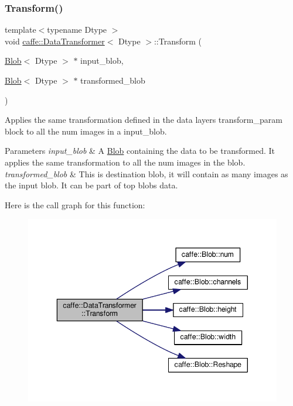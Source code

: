 \subsubsection{\texorpdfstring{Transform()}{Transform()}\hspace{0.1cm}{\footnotesize\ttfamily [5/6]}}
{\footnotesize\ttfamily template$<$typename Dtype $>$ \\
void \mbox{\hyperlink{classcaffe_1_1_data_transformer}{caffe\+::\+Data\+Transformer}}$<$ Dtype $>$\+::Transform (\begin{DoxyParamCaption}\item[{\mbox{\hyperlink{classcaffe_1_1_blob}{Blob}}$<$ Dtype $>$ $\ast$}]{input\+\_\+blob,  }\item[{\mbox{\hyperlink{classcaffe_1_1_blob}{Blob}}$<$ Dtype $>$ $\ast$}]{transformed\+\_\+blob }\end{DoxyParamCaption})}



Applies the same transformation defined in the data layer\textquotesingle{}s transform\+\_\+param block to all the num images in a input\+\_\+blob. 


\begin{DoxyParams}{Parameters}
{\em input\+\_\+blob} & A \mbox{\hyperlink{classcaffe_1_1_blob}{Blob}} containing the data to be transformed. It applies the same transformation to all the num images in the blob. \\
\hline
{\em transformed\+\_\+blob} & This is destination blob, it will contain as many images as the input blob. It can be part of top blob\textquotesingle{}s data. \\
\hline
\end{DoxyParams}
Here is the call graph for this function\+:
\nopagebreak
\begin{figure}[H]
\begin{center}
\leavevmode
\includegraphics[width=343pt]{classcaffe_1_1_data_transformer_a168abf1bf9466420da6968178c6edb4d_cgraph}
\end{center}
\end{figure}
\mbox{\label{classcaffe_1_1_data_transformer_a168abf1bf9466420da6968178c6edb4d}} 
